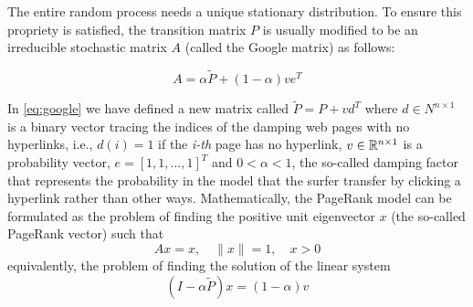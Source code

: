 \noindent The entire random process needs a unique stationary distribution. To ensure this propriety is satisfied, the transition matrix $P$ is usually modified to be an irreducible stochastic matrix $A$ (called the Google matrix) as follows:


\begin{equation}\label{eq:google}
    A = \alpha \tilde P + (1 - \alpha)v e^T
\end{equation}

\noindent In \ref{eq:google} we have defined a new matrix called $\tilde P = P + vd^T$ where $d \in N^{n \times 1}$ is a binary vector tracing the indices of the damping web pages with no hyperlinks, i.e., $d(i) = 1$ if the \emph{i-th} page has no hyperlink, $v \in \mathbb{R}^{n \times 1}$ is a probability vector, $e = [1, 1, ... ,1]^T$ and $0<\alpha<1$, the so-called damping factor that represents the probability in the model that the surfer transfer by clicking a hyperlink rather than other ways. Mathematically, the PageRank model can be formulated as the problem of finding the positive unit eigenvector $x$ (the so-called PageRank vector) such that
\begin{equation}\label{eq:pr}
    Ax = x, \quad \lVert x \rVert = 1, \quad x > 0
\end{equation}
equivalently, the problem of finding the solution of the linear system
\begin{equation}\label{eq:pr2}
    (I - \alpha \tilde P)x = (1 - \alpha)v
\end{equation}


